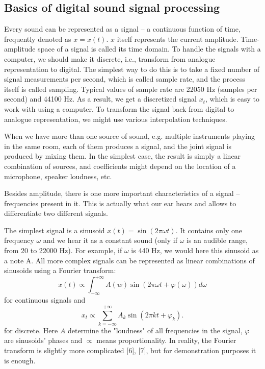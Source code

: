 \documentclass[../main.tex]{subfiles} %
\begin{document}
\subsection{Basics of digital sound signal processing}

Every sound can be represented as a signal -- a continuous function of time, frequently denoted as $x = x(t)$. $x$ itself represents the current amplitude. Time-amplitude space of a signal is called its time domain.
To handle the signals with a computer, we should make it discrete, i.e., transform from analogue representation to digital. The simplest way to do this is to take a fixed number of signal measurements per second, which is called sample rate, and the process itself is called sampling. Typical values of sample rate are 22050 Hz (samples per second) and 44100 Hz. As a result, we get a discretized signal $x_t$, which is easy to work with using a computer. To transform the signal back from digital to analogue representation, we might use various interpolation techniques.

When we have more than one source of sound, e.g. multiple instruments playing in the same room, each of them produces a signal, and the joint signal is produced by mixing them. In the simplest case, the result is simply a linear combination of sources, and coefficients might depend on the location of a microphone, speaker loudness, etc.


Besides amplitude, there is one more important characteristics of a signal -- frequencies present in it. This is actually what our ear hears and allows to differentiate two different signals.

The simplest signal is a sinusoid $x(t) = \sin(2\pi \omega t)$. It contains only one frequency $\omega$ and we hear it as a constant sound (only if $\omega$ is an audible range, from 20 to 22000 Hz). For example, if $\omega$ is 440 Hz, we would here this sinusoid as a note A.
All more complex signals can be represented as linear combinations of sinusoids using a Fourier transform: 
\[ x(t) \propto \int_{-\infty}^{+\infty} A(w) \sin(2\pi \omega t + \varphi(\omega)) d \omega \]
for continuous signals and 
\[ x_t \propto \sum_{k=-\infty}^{+\infty} A_k \sin(2 \pi k t + \varphi_k). \]
for discrete. 
Here $A$ determine the "loudness" of all frequencies in the signal, $\varphi$ are sinusoids' phases and $\propto$ means proportionality. In reality, the Fourier transform is slightly more complicated [6], [7], but for demonstration purposes it is enough.
\end{document}
